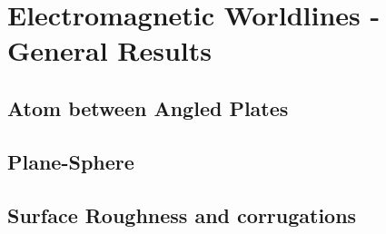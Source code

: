 \chapter{Electromagnetic Worldlines - General Results}

    \section{Atom between Angled Plates}
    \section{Plane-Sphere}
    \section{Surface Roughness and corrugations}

